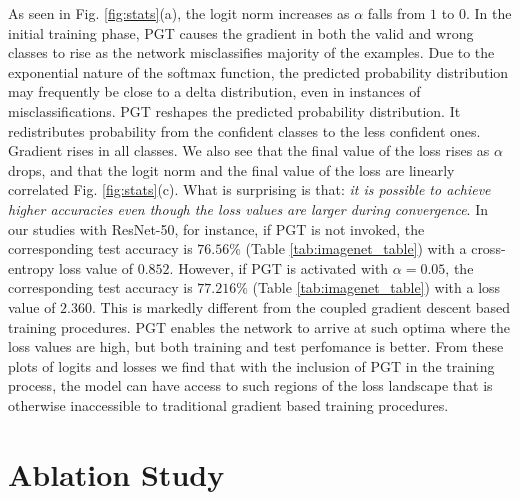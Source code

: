 \documentclass[times,sort&compress]{elsarticle}
\begin{document}
As seen in Fig. \ref{fig:stats}(a), the logit norm increases as $\alpha$ falls from $1$
to $0$. In the initial training phase, PGT causes the gradient in both the valid and
wrong classes to rise as the network misclassifies majority of the examples. Due to the
exponential nature of the softmax function, the predicted probability distribution may
frequently be close to a delta distribution, even in instances of misclassifications.
PGT reshapes the predicted probability distribution. It redistributes probability from
the confident classes to the less confident ones. Gradient rises in all classes. We also
see that the final value of the loss rises as $\alpha$ drops, and that the logit norm
and the final value of the loss are linearly correlated Fig. \ref{fig:stats}(c). What is
surprising is that: \textit{it is possible to achieve higher accuracies even though the
loss values are larger during convergence}. In our studies with ResNet-50, for instance,
if PGT is not invoked, the corresponding test accuracy is $76.56\%$ (Table
\ref{tab:imagenet_table}) with a cross-entropy loss value of $0.852$. However, if PGT is
activated with $\alpha=0.05$, the corresponding test accuracy is $77.216\%$ (Table
\ref{tab:imagenet_table}) with a loss value of $2.360$. This is markedly different from
the coupled gradient descent based training procedures. PGT enables the network to
arrive at such optima where the loss values are high, but both training and test
perfomance is better. From these plots of logits and losses we find that with the
inclusion of PGT in the training process, the model can have access to such regions of
the loss landscape that is otherwise inaccessible to traditional gradient based training
procedures.







\section{Ablation Study}
\label{sec:Abla}
\end{document}
